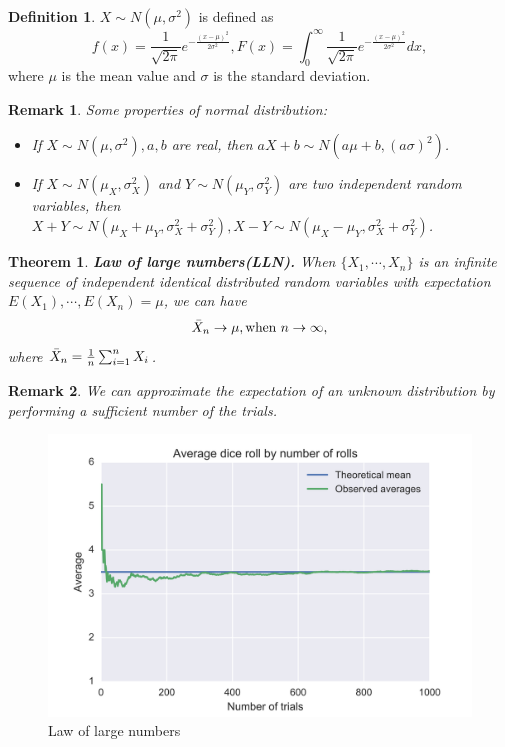 \documentclass[a4paper]{article}
\theoremstyle{definition}
\newtheorem{definition}{Definition}
\theoremstyle{plain}
\newtheorem{theorem}{Theorem}
\newtheorem{remark}{Remark}
\begin{document}
\begin{definition}
 $X\sim N(\mu,\sigma^2)$ is defined as 
\begin{equation*}
     f(x)=\frac{1}{\sqrt{2\pi}}e^{-\frac{(x-\mu)^2}{2\sigma^2}}, F(x)=\int_0^\infty\frac{1}{\sqrt{2\pi}}e^{-\frac{(x-\mu)^2}{2\sigma^2}}dx,
 \end{equation*}
 where $\mu$ is the mean value and $\sigma$ is the standard deviation.
\end{definition}

\begin{remark}
Some properties of normal distribution:
\begin{itemize}
    \item If $X\sim N(\mu,\sigma^2), a, b$ are real, then $aX+b\sim N(a\mu+b,(a\sigma)^2)$.
    \item If $X\sim N(\mu_X,\sigma_X^2)$ and $Y\sim N(\mu_Y,\sigma_Y^2)$ are two independent random variables, then $ X+Y \sim N(\mu_X + \mu_Y, \sigma^2_X + \sigma^2_Y), {\displaystyle X-Y\sim N(\mu _{X}-\mu _{Y},\sigma _{X}^{2}+\sigma _{Y}^{2})}$.
\end{itemize}
\end{remark}

\begin{theorem}
\textbf{Law of large numbers(LLN).} When $\{X_1,\cdots,X_n\}$ is an infinite sequence of independent identical distributed random variables with expectation $E(X_1),\cdots,E(X_n)=\mu$, we can have
\begin{equation*}
    \Bar{X}_n\rightarrow\mu, \text{when }n\rightarrow\infty,
\end{equation*}
where $\Bar{X}_n=\frac{1}{n}\sum^n_{i=1} X_i$.
\end{theorem}

\begin{remark}
We can approximate the expectation of an unknown distribution by performing a sufficient number of the trials.
\end{remark}

\begin{figure}[H]
    \centering
    \includegraphics[scale=0.15]{figure/1920px-Lawoflargenumbers.svg.png}
    \caption{Law of large numbers}
\end{figure}
\end{document}
